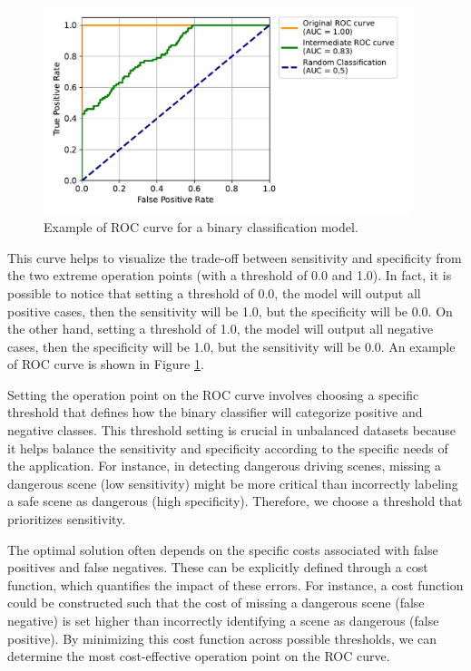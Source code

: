\begin{figure}
    \centering
    \includegraphics[width=0.95\textwidth]{images/roc/roc_curve.pdf}
    \caption
    {Example of ROC curve for a binary classification model.}
    \label{fig:roc_curve}
\end{figure}
This curve helps to 
visualize the trade-off between sensitivity and specificity from the two extreme 
operation points (with a threshold of 0.0 and 1.0).
In fact, it is possible to notice that setting a threshold of 0.0, the model 
will output all positive cases, then the sensitivity will be 1.0, but the 
specificity will be 0.0. On the other hand, setting a threshold of 1.0, the model 
will output all negative cases, then the specificity will be 1.0, but the 
sensitivity will be 0.0. An example of ROC curve is shown in Figure 
\ref{fig:roc_curve}.

Setting the operation point on the ROC curve involves choosing a specific 
threshold that defines how the binary classifier will categorize positive and 
negative classes. This threshold setting is crucial in unbalanced datasets 
because it helps balance the sensitivity and specificity according to the 
specific needs of the application. For instance, in detecting dangerous driving 
scenes, missing a dangerous scene (low sensitivity) might be more critical than 
incorrectly labeling a safe scene as dangerous (high specificity). Therefore, 
we choose a threshold that prioritizes sensitivity.

The optimal solution often depends on the specific costs associated with false 
positives and false negatives. These can be explicitly defined through a cost 
function, which quantifies the impact of these errors. For instance, a cost 
function could be constructed such that the cost of missing a dangerous scene 
(false negative) is set higher than incorrectly identifying a scene as dangerous 
(false positive). By minimizing this cost function across possible thresholds, 
we can determine the most cost-effective operation point on the ROC curve.

